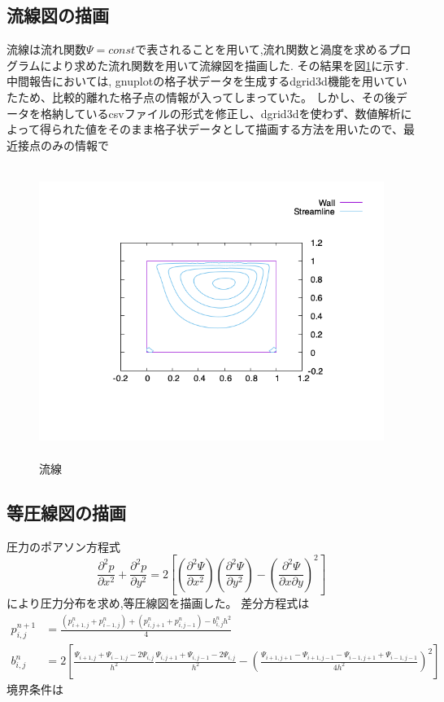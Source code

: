 \documentclass[upLaTeX,a4paper]{jsarticle}
\begin{document}
\subsection{流線図の描画}
流線は流れ関数$\varPsi = const$で表されることを用いて,流れ関数と渦度を求めるプログラムにより求めた流れ関数を用いて流線図を描画した.
その結果を図\ref{fig:stream_line}に示す.
中間報告においては, gnuplotの格子状データを生成するdgrid3d機能を用いていたため、比較的離れた格子点の情報が入ってしまっていた。
しかし、その後データを格納しているcsvファイルの形式を修正し、dgrid3dを使わず、数値解析によって得られた値をそのまま格子状データとして描画する方法を用いたので、最近接点のみの情報で

\begin{figure}[H]
  \centering
  \includegraphics[height=9.5cm]{outputs/img/stream_line.png}
  \caption{流線}
  \label{fig:stream_line}
\end{figure}
\subsection{等圧線図の描画}
圧力のポアソン方程式
\begin{equation}
  \frac{\partial ^2 p}{\partial x ^2} + \frac{\partial ^2 p}{\partial y ^2} = 2 \left[ \left(\frac{\partial ^2 \varPsi}{\partial x ^2}\right) \left(\frac{\partial ^2 \varPsi}{\partial y ^2}\right) - \left( \frac{\partial ^2 \varPsi}{\partial x \partial y}  \right) ^2 \right]
\end{equation}
により圧力分布を求め,等圧線図を描画した。
差分方程式は
\begin{equation}
  \begin{split}
    p_{i,j}^{n+1} & =\frac{(p_{i+1,j}^{n}+p_{i-1,j}^{n})+(p_{i,j+1}^{n}+p_{i,j-1}^{n})-b_{i,j}^{n}h^2}{4}\\
    b_{i,j}^{n} & = 2\left[ \frac{\varPsi_{i+1,j}+\varPsi_{i-1,j}- 2\varPsi_{i,j}}{h^2} \frac{\varPsi_{i,j+1}+\varPsi_{i,j-1}-2\varPsi_{i,j}}{h^2} - \left(\frac{\varPsi_{i+1,j+1}-\varPsi_{i+1,j-1}-\varPsi_{i-1,j+1}+\varPsi_{i-1,j-1}}{4h^2}\right)^2  \right]
  \end{split}
\end{equation}
境界条件は
\end{document}
